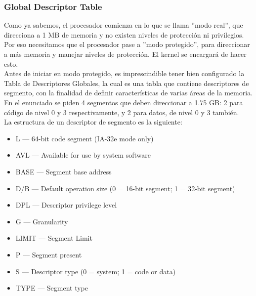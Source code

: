\subsubsection{Global Descriptor Table}
Como ya sabemos, el procesador comienza en lo que se llama ''modo real'', que direcciona a 1 MB de memoria y no existen niveles de protecci\'on ni privilegios.\\
Por eso necesitamos que el procesador pase a ''modo protegido'', para direccionar a m\'as memoria y manejar niveles de protecci\'on. El kernel se encargar\'a de hacer esto.\\
Antes de iniciar en modo protegido, es imprescindible tener bien configurado la Tabla de Descriptores Globales, la cual es una tabla que contiene descriptores de segmento, con la finalidad de definir caracter\'isticas de varias \'areas de la memoria.\\
En el enunciado se piden 4 segmentos que deben direccionar a 1.75 GB: 2 para c\'odigo de nivel 0 y 3 respectivamente, y 2 para datos, de nivel 0 y 3 tambi\'en.\\
La estructura de un descriptor de segmento es la siguiente:\\

\begin{itemize}
  \item L — 64-bit code segment (IA-32e mode only)
  \item AVL — Available for use by system software
  \item BASE — Segment base address
  \item D/B — Default operation size (0 = 16-bit segment; 1 = 32-bit segment)
  \item DPL — Descriptor privilege level
  \item G — Granularity
  \item LIMIT — Segment Limit
  \item P — Segment present
  \item S — Descriptor type (0 = system; 1 = code or data)
  \item TYPE — Segment type
\end{itemize}

